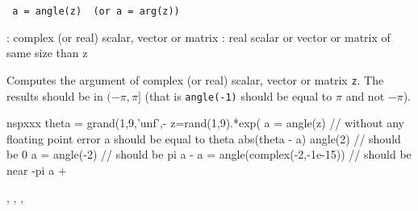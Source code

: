 
\begin{mandesc}
\end{mandesc}

\begin{calling_sequence}
\begin{verbatim}
 a = angle(z)  (or a = arg(z))
\end{verbatim}
\end{calling_sequence}

\begin{parameters}
  \begin{varlist}
   : complex (or real) scalar, vector or matrix
   : real scalar or vector or matrix of same size than z
  \end{varlist}
\end{parameters}

\begin{mandescription}
Computes the argument of complex (or real) scalar, vector or matrix \verb+z+.
The results should be in $(-\pi,\pi]$ (that is \verb+angle(-1)+ should be equal
to $\pi$ and not $-\pi$).
\end{mandescription}

\begin{examples}
\begin{mintednsp}{nspxxx}
theta = grand(1,9,'unf',- %
z=rand(1,9).*exp( %
a = angle(z)
// without any floating point error a should be equal to theta
abs(theta - a)
angle(2)  // should be 0
a = angle(-2)  // should be pi
a - %
a = angle(complex(-2,-1e-15)) // should be near -pi
a + %
\end{mintednsp}
\end{examples}

\begin{manseealso}
, , , 
\end{manseealso}

